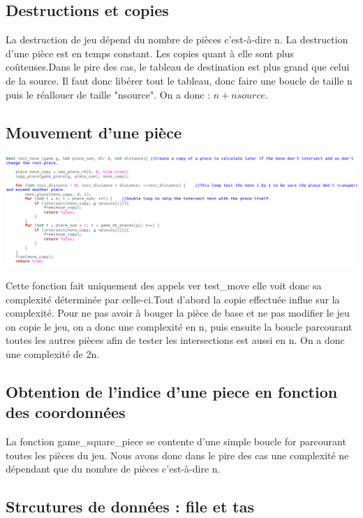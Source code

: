 \documentclass{article}
\begin{document}
\subsection{Destructions et copies}

La destruction de jeu dépend du nombre de pièces c'est-à-dire n. La destruction d'une pièce est en temps constant.
Les copies quant à elle sont plus coûteuses.Dans le pire des cas, le tableau de destination est plus grand que celui de la source. Il faut donc libérer tout le tableau, donc faire une boucle de taille n puis le réallouer de taille "nsource". On a donc : $n + nsource$.

\subsection{Mouvement d'une pièce}

\begin{flushleft}
\includegraphics[scale=0.35]{playmove.png}
\end{flushleft}


Cette fonction fait uniquement des appels ver test\_move elle voit donc sa complexité déterminée par celle-ci.Tout d'abord la copie effectuée influe sur la complexité. Pour ne pas avoir à bouger la pièce de base et ne pas modifier le jeu on copie le jeu, on a donc une complexité en n, puis ensuite la boucle parcourant toutes les autres pièces afin de tester les intersections est aussi en n. On a donc une complexité de 2n.
\subsection{Obtention de l'indice d'une piece en fonction des coordonnées}

La fonction game\_square\_piece se contente d'une simple boucle for parcourant toutes les pièces du jeu. Nous avons donc dans le pire des cas une complexité ne dépendant que du nombre de pièces c'est-à-dire n.

\subsection{Strcutures de données : file et tas}
\end{document}
